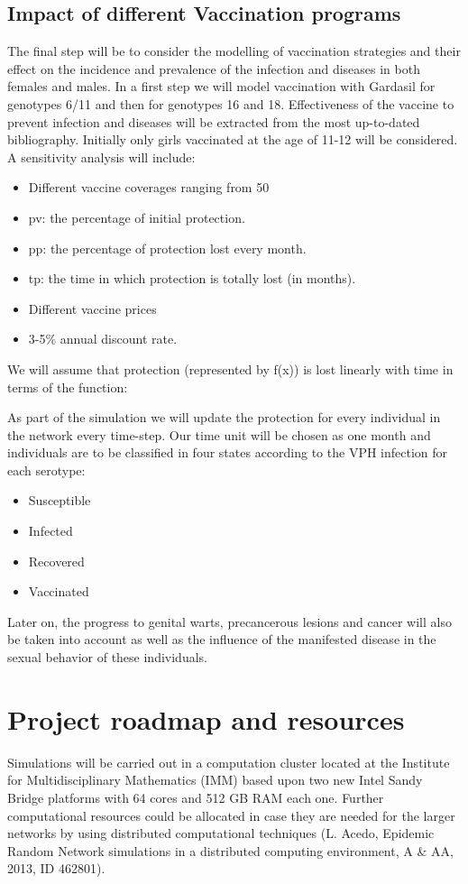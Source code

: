 \subsection{Impact of different Vaccination programs}

The final step will be to consider the modelling of vaccination strategies and their effect on the incidence and prevalence of the infection and diseases in both females and males. In a first step we will model vaccination with Gardasil for genotypes 6/11 and then for genotypes 16 and 18. Effectiveness of the vaccine to prevent infection and diseases will be extracted from the most up-to-dated bibliography. Initially only girls vaccinated at the age of 11-12 will be considered. A sensitivity analysis will include:
\begin{itemize}
	\item Different vaccine coverages ranging from 50%
	\item pv: the percentage of initial protection.
	\item pp: the percentage of protection lost every month.
	\item tp: the time in which protection is totally lost (in months).
	\item Different vaccine prices
	\item 3-5\% annual discount rate.
\end{itemize}

We will assume that protection (represented by f(x)) is lost linearly with time in terms of the function: 
 
 
 
As part of the simulation we will update the protection for every individual in the network every time-step. Our time unit will be chosen as one month and individuals are to be classified in four states according to the VPH infection for each serotype:
\begin{itemize}
	\item Susceptible
	\item Infected
	\item Recovered
	\item Vaccinated
\end{itemize}

Later on, the progress to genital warts, precancerous lesions and cancer will also be taken into account as well as the influence of the manifested disease in the sexual behavior of these individuals. 

\section{Project roadmap and resources}
Simulations will be carried out in a computation cluster located at the Institute for Multidisciplinary Mathematics (IMM) based upon two new Intel Sandy Bridge platforms with 64 cores and 512 GB RAM each one. Further computational resources could be allocated in case they are needed for the larger networks by using distributed computational techniques (L. Acedo, Epidemic Random Network simulations in a distributed computing environment, A \& AA, 2013, ID 462801). 

